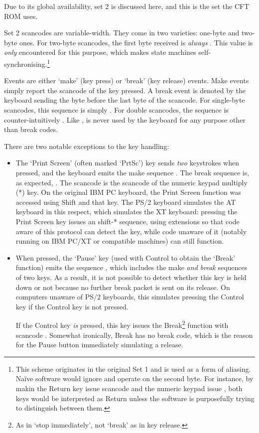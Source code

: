 Due to its global availability, set 2 is discussed here, and this is the set
the CFT ROM uses.

Set 2 scancodes are variable-width. They come in two varieties: one-byte and
two-byte ones. For two-byte scancodes, the first byte received is {\em
  always\/} . This value is {\em only\/} encountered for this purpose,
which makes state machines self-synchronising.\footnote{This scheme originates
  in the original Set 1 and is used as a form of aliasing. Naïve software would
  ignore  and operate on the second byte. For instance, by makin the
  Return key issue scancode  and the numeric keypad issue ,
  both keys would be interpreted as Return unless the software is purposefully
  trying to distinguish between them.}

Events are either ‘make’ (key press) or ‘break’ (key release) events. Make
events simply report the scancode of the key pressed. A break event is denoted
by the keyboard sending the byte  before the last byte of the
scancode. For single-byte scancodes, this sequence is simply . For
double scancodes, the sequence is counter-intuitively . Like
,  is never used by the keyboard for any purpose other than
break codes.

There are two notable exceptions to the key handling:

\begin{itemize}
\item The ‘Print Screen’ (often marked ‘PrtSc’) key sends {\em two\/}
  keystrokes when pressed, and the keyboard emits the make sequence . The break sequence is, as expected, . The
  scancode  is the scancode of the numeric keypad multiply (\textsf{*})
  key. On the original IBM PC keyboard, the Print Screen function was accessed
  using Shift and that key. The PS/2 keyboard simulates the AT keyboard in this
  respect, which simulates the XT keyboard: pressing the Print Screen key
  issues an shift-\textsf{*} sequence, using  extensions so that code
  aware of this protocol can detect the key, while code unaware of it (notably
  running on IBM PC/XT or compatible machines) can still function.

\item When pressed, the ‘Pause’ key (used with Control to obtain the ‘Break’
  function) emits the sequence , which includes
  the make {\em and break\/} sequences of two keys. As a result, it is not
  possible to detect whether this key is held down or not because no further
  break packet is sent on its release. On computers unaware of PS/2 keyboards,
  this simulates pressing the Control key if the Control key is not pressed.

  If the Control key {\em is\/} pressed, this key issues the Break\footnote{As
    in ‘stop immediately’, not ‘break’ as in key release.} function with
  scancode . Somewhat ironically, Break has no break code, which is the
  reason for the Pause button immediately simulating a release.
\end{itemize}

